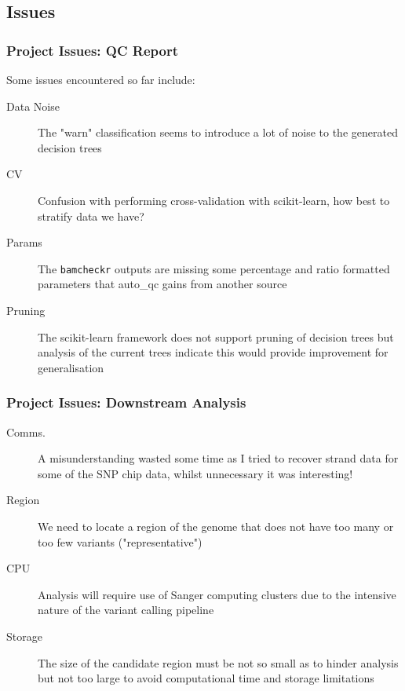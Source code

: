 \documentclass{beamer}
\begin{document}
\subsection{Issues}

\begin{frame}[t]
\frametitle{Project Issues: QC Report}
    Some issues encountered so far include:
    \begin{description}
        \item[Data Noise] The "warn" classification seems to introduce a lot of
            noise to the generated decision trees
        \item[CV] Confusion with performing cross-validation with scikit-learn,
            how best to stratify data we have?
        \item[Params] The \texttt{bamcheckr} outputs are missing some percentage
            and ratio formatted parameters that auto\_qc gains from another source
        \item[Pruning] The scikit-learn framework does not support pruning
            of decision trees but analysis of the current trees indicate this
            would provide improvement for generalisation
    \end{description}
\end{frame}

\begin{frame}[t]
\frametitle{Project Issues: Downstream Analysis}
    \begin{description}
        \item[Comms.] A misunderstanding wasted some time as I tried to recover
            strand data for some of the SNP chip data, whilst unnecessary it was
            interesting!
        \item[Region] We need to locate a region of the genome that does not have
            too many or too few variants ("representative")
        \item[CPU] Analysis will require use of Sanger computing clusters due to
            the intensive nature of the variant calling pipeline
        \item[Storage] The size of the candidate region must be not so small as
            to hinder analysis but not too large to avoid computational time and
            storage limitations
    \end{description}
\end{frame}


\end{document}
